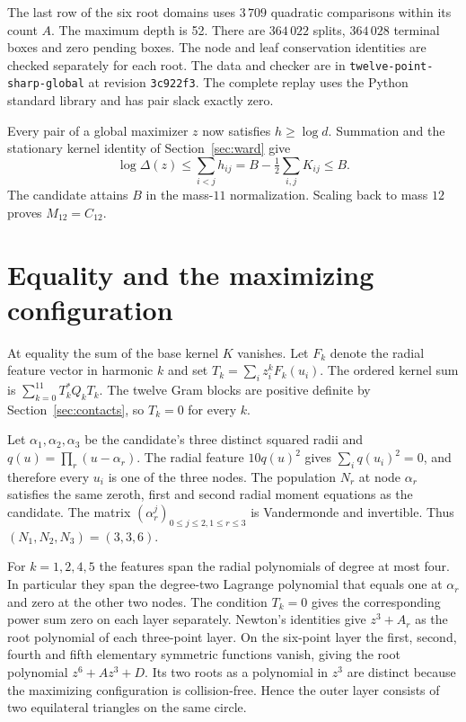 \documentclass[11pt,letterpaper]{article}
\theoremstyle{remark}
\begin{document}
The last row of the six root domains uses \(3\,709\) quadratic
comparisons within its count \(A\). The maximum depth is 52.
There are \(364\,022\) splits, \(364\,028\) terminal boxes and
zero pending boxes. The node and leaf conservation identities
are checked separately for each root. The data and checker
are in \texttt{twelve-point-sharp-global} at revision
\texttt{3c922f3}. The complete replay uses the Python standard
library and has pair slack exactly zero.

Every pair of a global maximizer \(z\) now satisfies \(h\ge\log d\).
Summation and the stationary kernel identity of
Section~\ref{sec:ward} give
\[
 \log\Delta(z)\le\sum_{i<j}h_{ij}
       =B-\tfrac12\sum_{i,j}K_{ij}\le B.
\]
The candidate attains \(B\) in the mass-\(11\) normalization.
Scaling back to mass \(12\) proves \(M_{12}=C_{12}\).

\section{Equality and the maximizing configuration}
\label{sec:equality}

At equality the sum of the base kernel \(K\) vanishes.
Let \(F_k\) denote the radial feature vector in harmonic \(k\)
and set \(T_k=\sum_i z_i^k F_k(u_i)\). The ordered kernel sum
is \(\sum_{k=0}^{11}T_k^*Q_kT_k\). The twelve Gram blocks
are positive definite by Section~\ref{sec:contacts}, so
\(T_k=0\) for every \(k\).

Let \(\alpha_1,\alpha_2,\alpha_3\) be the candidate's three
distinct squared radii and \(q(u)=\prod_r(u-\alpha_r)\).
The radial feature \(10q(u)^2\) gives \(\sum_i q(u_i)^2=0\),
and therefore every \(u_i\) is one of the three nodes. The
population \(N_r\) at node \(\alpha_r\) satisfies the same
zeroth, first and second radial moment equations as the
candidate. The matrix \((\alpha_r^j)_{0\le j\le2,1\le r\le3}\)
is Vandermonde and invertible. Thus \((N_1,N_2,N_3)=(3,3,6)\).

For \(k=1,2,4,5\) the features span the radial polynomials
of degree at most four. In particular they span the degree-two
Lagrange polynomial that equals one at \(\alpha_r\) and zero at
the other two nodes. The condition \(T_k=0\) gives the corresponding
power sum zero on each layer separately. Newton's identities
give \(z^3+A_r\) as the root polynomial of each three-point
layer. On the six-point layer the first, second, fourth and
fifth elementary symmetric functions vanish, giving the root
polynomial \(z^6+A z^3+D\). Its two roots as a polynomial in
\(z^3\) are distinct because the maximizing configuration is
collision-free. Hence the outer layer consists of two
equilateral triangles on the same circle.
\end{document}
